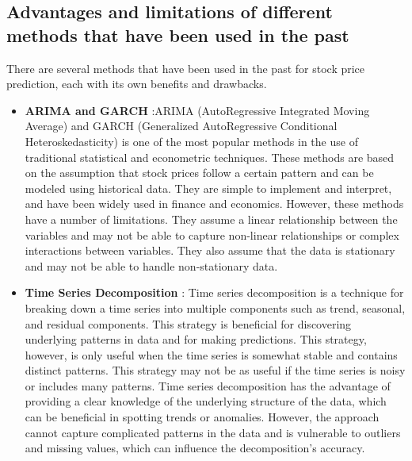 \documentclass[a4paper]{article}
\begin{document}
\subsection{Advantages and limitations of different methods that have been used in the past}
There are several methods that have been used in the past for stock price prediction, each with its own benefits and drawbacks.
\begin{itemize}[leftmargin=7.5pt]
    \item \textbf{ARIMA and GARCH} :ARIMA (AutoRegressive Integrated Moving Average) and GARCH (Generalized AutoRegressive Conditional Heteroskedasticity) is one of the most popular methods in the use of traditional statistical and econometric techniques. These methods are based on the assumption that stock prices follow a certain pattern and can be modeled using historical data. They are simple to implement and interpret, and have been widely used in finance and economics. However, these methods have a number of limitations. They assume a linear relationship between the variables and may not be able to capture non-linear relationships or complex interactions between variables. They also assume that the data is stationary and may not be able to handle non-stationary data.
    \item \textbf{Time Series Decomposition} : Time series decomposition is a technique for breaking down a time series into multiple components such as trend, seasonal, and residual components. This strategy is beneficial for discovering underlying patterns in data and for making predictions. This strategy, however, is only useful when the time series is somewhat stable and contains distinct patterns. This strategy may not be as useful if the time series is noisy or includes many patterns. Time series decomposition has the advantage of providing a clear knowledge of the underlying structure of the data, which can be beneficial in spotting trends or anomalies. However, the approach cannot capture complicated patterns in the data and is vulnerable to outliers and missing values, which can influence the decomposition's accuracy.

\end{itemize}
\end{document}
